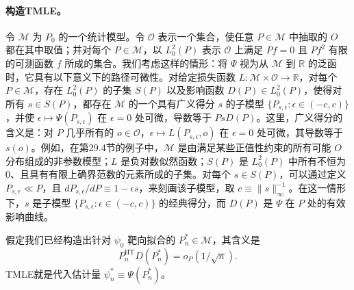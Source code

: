\paragraph{构造TMLE。}
令 $\mathcal M$ 为 $P_0$ 的一个统计模型。令 $\mathcal O$ 表示一个集合，使任意 $P\in\mathcal M$ 中抽取的 $O$ 都在其中取值；并对每个 $P\in\mathcal M$，以 $L_0^2(P)$ 表示 $\mathcal O$ 上满足 $Pf=0$ 且 $Pf^2$ 有限的可测函数 $f$ 所成的集合。我们考虑这样的情形：将 $\Psi$ 视为从 $\mathcal M$ 到 $\mathbb R$ 的泛函时，它具有以下意义下的路径可微性。对给定损失函数 $L:\mathcal M\times\mathcal O\to\mathbb R$，对每个 $P\in\mathcal M$，存在 $L_0^2(P)$ 的子集 $S(P)$ 以及影响函数 $D(P)\in L_0^2(P)$，使得对所有 $s\in S(P)$，都存在 $\mathcal M$ 的一个具有广义得分 $s$ 的子模型 $\{P_{s,\epsilon}:\epsilon\in(-c,c)\}$，并使 $\epsilon\mapsto\Psi(P_{s,\epsilon})$ 在 $\epsilon=0$ 处可微，导数等于 $PsD(P)$。这里，广义得分的含义是：对 $P$ 几乎所有的 $o\in\mathcal O$，$\epsilon\mapsto L(P_{s,\epsilon},o)$ 在 $\epsilon=0$ 处可微，其导数等于 $s(o)$。例如，在第29.4节的例子中，$\mathcal M$ 是由满足某些正值性约束的所有可能 $O$ 分布组成的非参数模型；$L$ 是负对数似然函数；$S(P)$ 是 $L_0^2(P)$ 中所有不恒为0、且具有有限上确界范数的元素所成的子集。对每个 $s\in S(P)$，可以通过定义 $P_{s,\epsilon}\ll P$，且 $dP_{s,\epsilon}/dP\equiv1-\epsilon s$，来刻画该子模型，取 $c\equiv\|s\|_\infty^{-1}$。在这一情形下，$s$ 是子模型 $\{P_{s,\epsilon}:\epsilon\in(-c,c)\}$ 的经典得分，而 $D(P)$ 是 $\Psi$ 在 $P$ 处的有效影响曲线。

假定我们已经构造出针对 $\psi_0$ 靶向拟合的 $P_n^*\in\mathcal M$，其含义是
\begin{equation}
P_n^{\mathrm{HT}}D(P_n^*)=o_P(1/\sqrt n).
\tag{29.3}
\end{equation}
TMLE就是代入估计量 $\psi_n^*\equiv\Psi(P_n^*)$。

